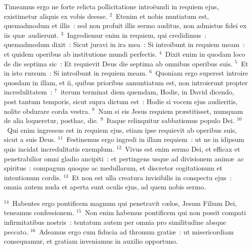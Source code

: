 \bchapter
\lettrine[lines=3,image=true,loversize=0.05,lraise=-0.03]{T}{}imeamus ergo ne forte relicta pollicitatione intro\"eundi in requiem ejus, existimetur aliquis ex vobis deesse.
${}^{2}$~Etenim et nobis nuntiatum est, quemadmodum et illis~: sed non profuit illis sermo auditus, non admistus fidei ex iis qu\ae\ audierunt.
${}^{3}$~Ingrediemur enim in requiem, qui credidimus~: quemadmodum dixit~: Sicut juravi in ira mea~: Si introibunt in requiem meam~: et quidem operibus ab institutione mundi perfectis.
${}^{4}$~Dixit enim in quodam loco de die septima sic~: Et requievit Deus die septima ab omnibus operibus suis.
${}^{5}$~Et in isto rursum~: Si introibunt in requiem meam.
${}^{6}$~Quoniam ergo superest introire quosdam in illam, et ii, quibus prioribus annuntiatum est, non introierunt propter incredulitatem~:
${}^{7}$~iterum terminat diem quemdam, Hodie, in David dicendo, post tantum temporis, sicut supra dictum est~: Hodie si vocem ejus audieritis, nolite obdurare corda vestra.
${}^{8}$~Nam si eis Jesus requiem pr\ae stitisset, numquam de alia loqueretur, posthac, die.
${}^{9}$~Itaque relinquitur sabbatismus populo Dei.
${}^{10}$~Qui enim ingressus est in requiem ejus, etiam ipse requievit ab operibus suis, sicut a suis Deus.
${}^{11}$~Festinemus ergo ingredi in illam requiem~: ut ne in idipsum quis incidat incredulitatis exemplum.
${}^{12}$~Vivus est enim sermo Dei, et efficax et penetrabilior omni gladio ancipiti~: et pertingens usque ad divisionem anim\ae\ ac spiritus~: compagum quoque ac medullarum, et discretor cogitationum et intentionum cordis.
${}^{13}$~Et non est ulla creatura invisibilis in conspectu ejus~: omnia autem nuda et aperta sunt oculis ejus, ad quem nobis sermo.


${}^{14}$~Habentes ergo pontificem magnum qui penetravit c\ae los, Jesum Filium Dei, teneamus confessionem.
${}^{15}$~Non enim habemus pontificem qui non possit compati infirmitatibus nostris~: tentatum autem per omnia pro similitudine absque peccato.
${}^{16}$~Adeamus ergo cum fiducia ad thronum grati\ae~: ut misericordiam consequamur, et gratiam inveniamus in auxilio opportuno.

